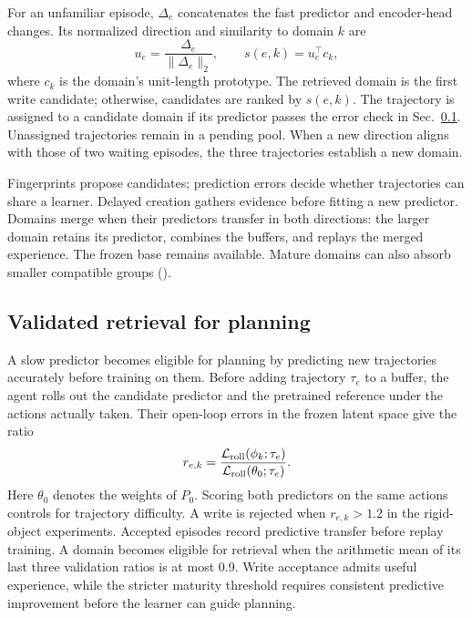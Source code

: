 For an unfamiliar episode, $\Delta_e$ concatenates the fast predictor and encoder-head changes. Its normalized direction and similarity to domain $k$ are
\begin{equation}
  u_e=\frac{\Delta_e}{\|\Delta_e\|_2},
  \qquad s(e,k)=u_e^\top c_k,
  \label{eq:fingerprint}
\end{equation}
where $c_k$ is the domain's unit-length prototype. The retrieved domain is the first write candidate; otherwise, candidates are ranked by $s(e,k)$. The trajectory is assigned to a candidate domain if its predictor passes the error check in Sec.~\ref{sec:trust}. Unassigned trajectories remain in a pending pool. When a new direction aligns with those of two waiting episodes, the three trajectories establish a new domain.

Fingerprints propose candidates; prediction errors decide whether trajectories can share a learner. Delayed creation gathers evidence before fitting a new predictor. Domains merge when their predictors transfer in both directions: the larger domain retains its predictor, combines the buffers, and replays the merged experience. The frozen base remains available. Mature domains can also absorb smaller compatible groups ().



\subsection{Validated retrieval for planning}
\label{sec:trust}

A slow predictor becomes eligible for planning by predicting new trajectories accurately before training on them. Before adding trajectory $\tau_e$ to a buffer, the agent rolls out the candidate predictor and the pretrained reference under the actions actually taken. Their open-loop errors in the frozen latent space give the ratio
\begin{equation}
  r_{e,k}=
  \frac{\mathcal{L}_{\mathrm{roll}}(\phi_k;\tau_e)}
       {\mathcal{L}_{\mathrm{roll}}(\theta_0;\tau_e)}.
  \label{eq:ratio}
\end{equation}
Here $\theta_0$ denotes the weights of $P_0$. Scoring both predictors on the same actions controls for trajectory difficulty. A write is rejected when $r_{e,k}>1.2$ in the rigid-object experiments. Accepted episodes record predictive transfer before replay training. A domain becomes eligible for retrieval when the arithmetic mean of its last three validation ratios is at most 0.9. Write acceptance admits useful experience, while the stricter maturity threshold requires consistent predictive improvement before the learner can guide planning.

